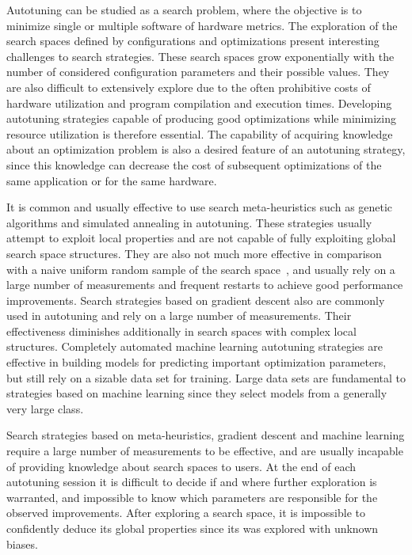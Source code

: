 \documentclass[conference]{IEEEtran}
\begin{document}
Autotuning can be studied as a search problem, where the objective is to
minimize single or multiple software of hardware metrics. The exploration of the
search spaces defined by configurations and optimizations present interesting
challenges to search strategies. These search spaces grow exponentially with the
number of considered configuration parameters and their possible values. They
are also difficult to extensively explore due to the often prohibitive costs of
hardware utilization and program compilation and execution times. Developing
autotuning strategies capable of producing good optimizations while minimizing
resource utilization is therefore essential. The capability of acquiring
knowledge about an optimization problem is also a desired feature of an
autotuning strategy, since this knowledge can decrease the cost of subsequent
optimizations of the same application or for the same hardware.

It is common and usually effective to use search meta-heuristics such as genetic
algorithms and simulated annealing in autotuning. These strategies usually
attempt to exploit local properties and are not capable of fully exploiting
global search space structures. They are also not much more effective in
comparison with a naive uniform random sample of the search
space~\cite{seymour2008comparison,knijnenburg2003combined}, and usually rely on a
large number of measurements and frequent restarts to achieve good performance
improvements. Search strategies based on gradient descent also are commonly used
in autotuning and rely on a large number of measurements. Their effectiveness
diminishes additionally in search spaces with complex local structures.
Completely automated machine learning autotuning strategies are effective in
building models for predicting important optimization parameters, but still rely
on a sizable data set for training. Large data sets are fundamental to
strategies based on machine learning since they select models from a generally
very large class.

Search strategies based on meta-heuristics, gradient descent and machine
learning require a large number of measurements to be effective, and are usually
incapable of providing knowledge about search spaces to users. At the end of
each autotuning session it is difficult to decide if and where further
exploration is warranted, and impossible to know which parameters are
responsible for the observed improvements. After exploring a search space, it is
impossible to confidently deduce its global properties since its was explored
with unknown biases.
\end{document}
